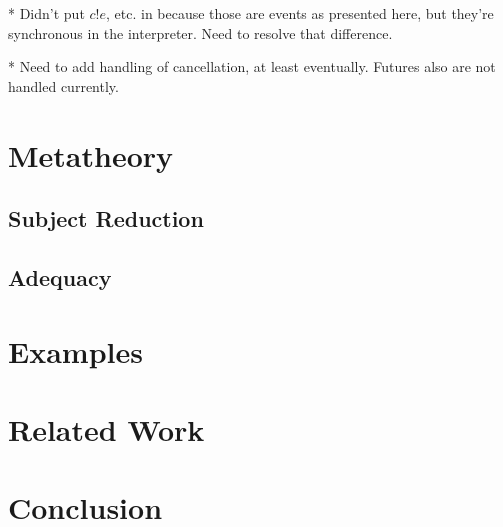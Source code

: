\documentclass[acmsmall]{acmart}
\begin{document}
* Didn't put $c!e$, etc. in because those are events as presented here,
but they're synchronous in the interpreter. Need to resolve that
difference.

* Need to add handling of cancellation, at least eventually. Futures
also are not handled currently.

\section{Metatheory}

\subsection{Subject Reduction}

\subsection{Adequacy}

\section{Examples}

\section{Related Work}

\section{Conclusion}
\end{document}
